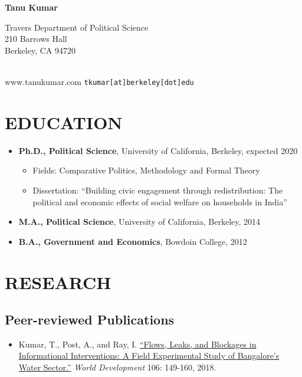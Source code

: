 \documentclass[11pt]{article}
\begin{document}
\thispagestyle{empty}
\begin{center}
\textbf{\Huge{Tanu Kumar}}
\end{center}

\begin{minipage}[t]{0.5\textwidth}
Travers Department of Political Science\\
210 Barrows Hall\\
Berkeley, CA 94720\\ \\
\end{minipage}
\begin{minipage}[t]{0.5\textwidth}
\begin{flushright}
www.tanukumar.com
\texttt{tkumar[at]berkeley[dot]edu}
\end{flushright}\end{minipage}
\section*{EDUCATION}

	\begin{itemize}[nosep]
		\item[] \textbf{Ph.D., Political Science}, University of California, Berkeley, expected 2020
		\begin{itemize}[nosep]
	\item[] Fields: Comparative Politics, Methodology and Formal Theory
	\item[] Dissertation: ``Building civic engagement through redistribution: The political and economic effects of social welfare on households in India''
\end{itemize}
	\item[]  \textbf{M.A., Political Science}, University of California, Berkeley, 2014
	\item[] \textbf{B.A., Government and Economics}, Bowdoin College, 2012

\end{itemize}	
\vspace{3mm}
\section*{RESEARCH}

\subsection*{Peer-reviewed Publications}
\begin{itemize}
		\item[] Kumar, T., Post, A., and Ray, I. \href{https://www.sciencedirect.com/science/article/pii/S0305750X18300329}{``Flows, Leaks, and Blockages in Informational Interventions: A Field Experimental Study of Bangalore's Water Sector.''} \textit{World Development} 106: 149-160, 2018.
\end{itemize}
\end{document}
